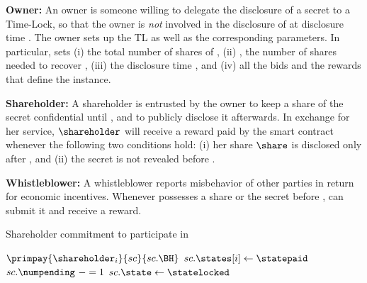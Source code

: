 \begin{asparaitem}
\item {\bf Owner:}	An owner \owner is someone willing to delegate the disclosure of a secret \secret to a Time-Lock, so that the owner is \textit{not} involved in the disclosure of \secret at disclosure time \td.
The owner \owner sets up the TL as well as the corresponding parameters.
In particular, \owner sets (i) \N the total number of shares \share of \secret, (ii) \K, the number of shares needed to recover \secret, (iii) the disclosure time \td, and (iv) all the bids and the rewards that define the instance.


\item {\bf Shareholder:}
A shareholder \shareholder is entrusted by the owner \owner to keep a share \share of the secret \secret confidential until \td, and to publicly disclose it afterwards.
In exchange for her service, $\shareholder$ will receive a reward paid by the smart contract whenever the following two conditions hold: (i) her share $\share$ is disclosed only after \td, and (ii) the secret \secret is not revealed before \td.

\item {\bf Whistleblower:}
A whistleblower \whistleblower reports misbehavior of other parties in return for economic incentives.
Whenever \whistleblower possesses a share \share or the secret \secret before \td, \whistleblower can submit it and receive a reward.
\end{asparaitem}


\begin{algorithm}[t]
	\caption{Shareholder commitment to participate in \shortname}\label{algo:shareholder_commitment}
	\begin{algorithmic}[1]
		\vspace{0.6em}
		\vspace*{0.6em}
		
		\State $\primpay{\shareholder_i}{sc}{sc.\BH}$
		\State $sc.\states[i]\gets \statepaid$
		\State $sc.\numpending\ -= 1$
		\State $sc.\state\gets \statelocked$
		\EndIf
		\EndIf
		\EndIf
		\EndProcedure
	\end{algorithmic}
\end{algorithm}

